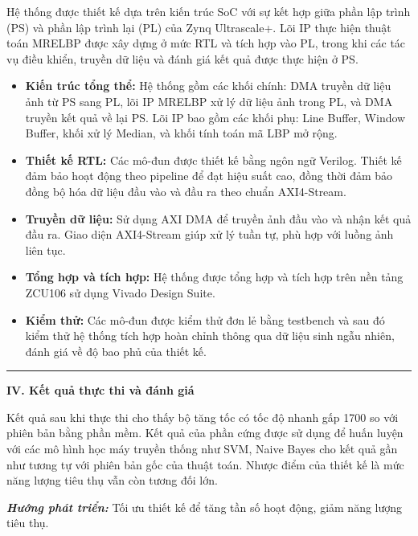 Hệ thống được thiết kế dựa trên kiến trúc SoC với sự kết hợp giữa phần lập trình (PS) và phần lập trình lại (PL) của Zynq Ultrascale+. Lõi IP thực hiện thuật toán MRELBP được xây dựng ở mức RTL và tích hợp vào PL, trong khi các tác vụ điều khiển, truyền dữ liệu và đánh giá kết quả được thực hiện ở PS.

\begin{itemize}
	\item \textbf{Kiến trúc tổng thể:} Hệ thống gồm các khối chính: DMA truyền dữ liệu ảnh từ PS sang PL, lõi IP MRELBP xử lý dữ liệu ảnh trong PL, và DMA truyền kết quả về lại PS. Lõi IP bao gồm các khối phụ: Line Buffer, Window Buffer, khối xử lý Median, và khối tính toán mã LBP mở rộng.
	
	\item \textbf{Thiết kế RTL:} Các mô-đun được thiết kế bằng ngôn ngữ Verilog. Thiết kế đảm bảo hoạt động theo pipeline để đạt hiệu suất cao, đồng thời đảm bảo đồng bộ hóa dữ liệu đầu vào và đầu ra theo chuẩn AXI4-Stream.
	
	\item \textbf{Truyền dữ liệu:} Sử dụng AXI DMA để truyền ảnh đầu vào và nhận kết quả đầu ra. Giao diện AXI4-Stream giúp xử lý tuần tự, phù hợp với luồng ảnh liên tục.
	
	\item \textbf{Tổng hợp và tích hợp:} Hệ thống được tổng hợp và tích hợp trên nền tảng ZCU106 sử dụng Vivado Design Suite.
	
	\item \textbf{Kiểm thử:} Các mô-đun được kiểm thử đơn lẻ bằng testbench và sau đó kiểm thử hệ thống tích hợp hoàn chỉnh thông qua dữ liệu sinh ngẫu nhiên, đánh giá về độ bao phủ của thiết kế. 
\end{itemize}

\noindent\rule{\linewidth}{0.5pt} %

\vspace{0.5em} %
\noindent\textbf{IV. \hspace{0.5em} Kết quả thực thi và đánh giá}


Kết quả sau khi thực thi cho thấy bộ tăng tốc có tốc độ nhanh gấp 1700 so với phiên bản bằng phần mềm. Kết quả của phần cứng được sử dụng để huấn luyện với các mô hình học máy truyền thống như SVM, Naive Bayes cho kết quả gần như tương tự với phiên bản gốc của thuật toán. Nhược điểm của thiết kế là mức năng lượng tiêu thụ vẫn còn tương đối lớn.


\textbf{\textit{Hướng phát triển: }} Tối ưu thiết kế để tăng tần số hoạt động, giảm năng lượng tiêu thụ. 


